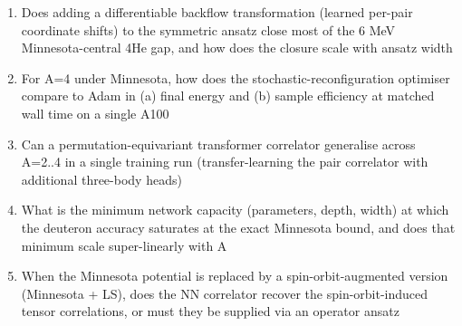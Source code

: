 \documentclass[11pt]{article}
\begin{document}
\begin{enumerate}[leftmargin=1.6em,itemsep=0.2em,topsep=0.2em,label=Q\arabic*.]
\item Does adding a differentiable backflow transformation (learned per-pair coordinate shifts) to the symmetric ansatz close most of the 6 MeV Minnesota-central 4He gap, and how does the closure scale with ansatz width
\item For A=4 under Minnesota, how does the stochastic-reconfiguration optimiser compare to Adam in (a) final energy and (b) sample efficiency at matched wall time on a single A100
\item Can a permutation-equivariant transformer correlator generalise across A=2..4 in a single training run (transfer-learning the pair correlator with additional three-body heads)
\item What is the minimum network capacity (parameters, depth, width) at which the deuteron accuracy saturates at the exact Minnesota bound, and does that minimum scale super-linearly with A
\item When the Minnesota potential is replaced by a spin-orbit-augmented version (Minnesota + LS), does the NN correlator recover the spin-orbit-induced tensor correlations, or must they be supplied via an operator ansatz
\end{enumerate}
\end{document}
